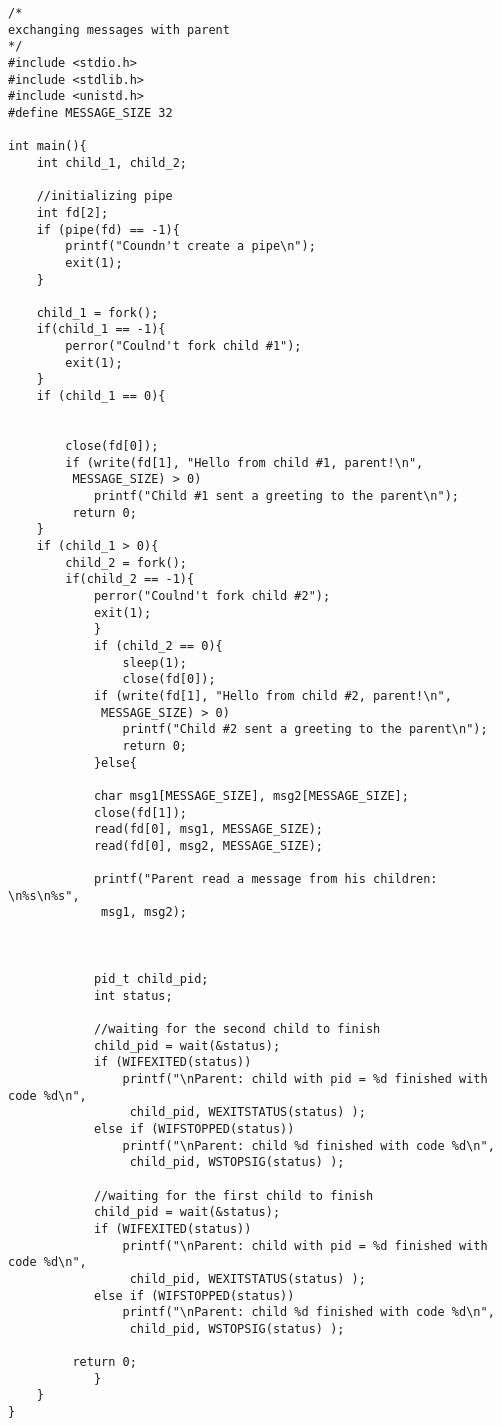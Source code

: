\documentclass[12pt]{report}
\begin{document}
\begin{lstlisting}[label=four,caption = Передача сообщений с помощью программного канала, style = CStyle]
/*
exchanging messages with parent
*/
#include <stdio.h>
#include <stdlib.h>
#include <unistd.h>
#define MESSAGE_SIZE 32

int main(){
	int child_1, child_2;
	
	//initializing pipe
	int fd[2];
	if (pipe(fd) == -1){
		printf("Coundn't create a pipe\n");
		exit(1);
	}
	
	child_1 = fork();
	if(child_1 == -1){
		perror("Coulnd't fork child #1");
		exit(1);
	}
	if (child_1 == 0){
		
		 
		close(fd[0]);
		if (write(fd[1], "Hello from child #1, parent!\n",
		 MESSAGE_SIZE) > 0)
			printf("Child #1 sent a greeting to the parent\n");
		 return 0;
	}
	if (child_1 > 0){
		child_2 = fork();
		if(child_2 == -1){
			perror("Coulnd't fork child #2");
			exit(1);
	        }
	        if (child_2 == 0){
	        	sleep(1);
	        	close(fd[0]);
			if (write(fd[1], "Hello from child #2, parent!\n",
			 MESSAGE_SIZE) > 0)
				printf("Child #2 sent a greeting to the parent\n");
			 	return 0;
	        }else{
		  	
		  	char msg1[MESSAGE_SIZE], msg2[MESSAGE_SIZE];
			close(fd[1]);
			read(fd[0], msg1, MESSAGE_SIZE);
			read(fd[0], msg2, MESSAGE_SIZE);
			
			printf("Parent read a message from his children: \n%s\n%s",
			 msg1, msg2); 
			
			
			
		  	pid_t child_pid;
		 	int status;
		 	
		 	//waiting for the second child to finish
		 	child_pid = wait(&status);
		 	if (WIFEXITED(status))
		 		printf("\nParent: child with pid = %d finished with code %d\n",
		 		 child_pid, WEXITSTATUS(status) );
		 	else if (WIFSTOPPED(status))
		 		printf("\nParent: child %d finished with code %d\n",
		 		 child_pid, WSTOPSIG(status) );
		 		 
		 	//waiting for the first child to finish	 
		 	child_pid = wait(&status);
		 	if (WIFEXITED(status))
		 		printf("\nParent: child with pid = %d finished with code %d\n",
		 		 child_pid, WEXITSTATUS(status) );
		 	else if (WIFSTOPPED(status))
		 		printf("\nParent: child %d finished with code %d\n",
		 		 child_pid, WSTOPSIG(status) );
		 
		 return 0;
	        }
	}
}



\end{lstlisting}
\end{document}
